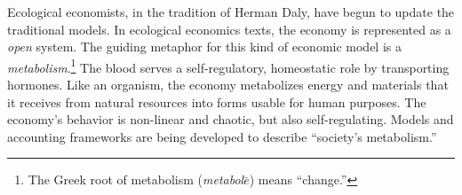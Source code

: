 
Ecological economists, 
in the tradition of Herman Daly, 
have begun to update the traditional models.\cite{F-K2003} 
In ecological economics texts, 
the economy is 
represented as a \emph{open} system. 
The guiding metaphor for this kind of 
economic model is a \emph{metabolism}.\footnote{The 
	Greek root of metabolism 
	(\emph{metabol$\bar{e}$}) means ``change.''}
The blood serves a self-regulatory, homeostatic role
by transporting hormones. 
Like an organism,
the economy metabolizes energy and materials 
that it receives from natural resources into forms 
usable for human purposes.
The economy's behavior is non-linear and chaotic,
but also self-regulating.
Models and accounting frameworks are being
developed to describe ``society's metabolism.''~\cite{F-K1998, 
ConAccount1998, Giampietro2000, Daniels2001, Ayres2002, 
Haberl2001, Giampietro2013}

